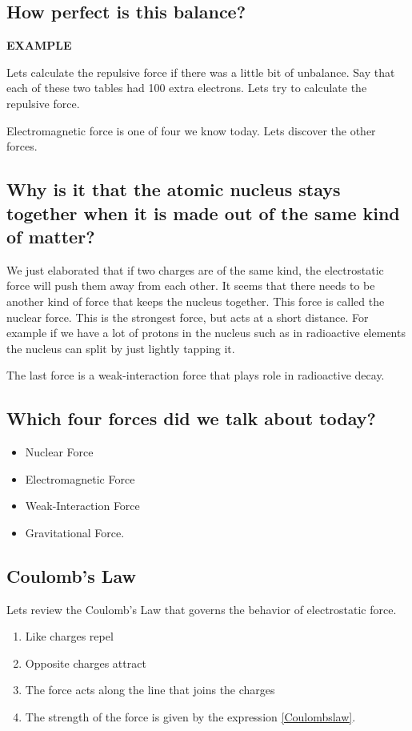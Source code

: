 \subsection{How perfect is this balance?}

{\bf EXAMPLE} 


Lets calculate the repulsive force if there was a little bit of unbalance. Say that each of these two tables had 100 extra electrons. Lets try to calculate the repulsive force. 


Electromagnetic force is one of four we know today. Lets discover the other forces.


\subsection{Why is it that the atomic nucleus stays together when it is made out of the same kind of matter?}


We just elaborated that if two charges are of the same kind, the electrostatic force will push them away from each other. It seems that there needs to be another kind of force that keeps the nucleus together. This force is called the nuclear force. This is the strongest force, but acts at a short distance. For example if we have a lot of protons in the nucleus such as in radioactive elements the nucleus can split by just lightly tapping it. 

The last force is a weak-interaction force that plays role in radioactive decay. 


\subsection{Which four forces did we talk about today?}

\begin{itemize}
\item Nuclear Force
\item Electromagnetic Force
\item Weak-Interaction Force
\item Gravitational Force.
\end{itemize}

\subsection{Coulomb's Law}

Lets review the Coulomb's Law that governs the behavior of electrostatic force.

\begin{enumerate}
\item Like charges repel
\item Opposite charges attract
\item The force acts along the line that joins the charges
\item The strength of the force is given by the expression \ref{Coulombslaw}.
\end{enumerate}





